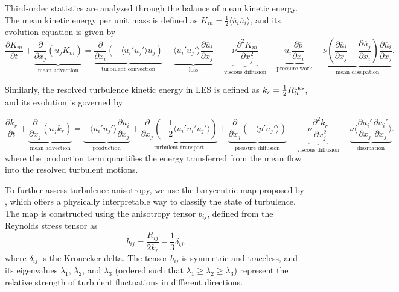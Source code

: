 \documentclass[final,3p]{elsarticle}
\begin{document}
Third-order statistics are analyzed through the balance of mean kinetic energy. The mean kinetic energy per unit mass is defined as $K_m = \frac{1}{2} \langle \overline{u}_i \overline{u}_i \rangle$, and its evolution equation is given by
\begin{equation}
\frac{\partial K_m}{\partial t}
+ \underbrace{ \frac{\partial}{\partial x_j} (\overline{u}_j K_m) }_{\text{mean advection}}
=
\underbrace{ \frac{\partial}{\partial x_i}
\left(
- \langle u_i' u_j' \rangle \overline{u}_j
\right) }_{\text{turbulent convection}}
+
\underbrace{\langle u_i' u_j' \rangle \frac{\partial \overline{u}_i}{\partial x_j} }_{\text{loss}}
+ \underbrace{\nu \frac{\partial^2 K_m}{\partial x_j^2}}_{\text{viscous diffusion}}
- \underbrace{ \overline{u}_i \frac{\partial \overline{p}}{\partial x_i} }_{\text{pressure work}}
- \underbrace{ \nu \left( \frac{\partial \overline{u}_i}{\partial x_j} + \frac{\partial \overline{u}_j}{\partial x_i} \right) \frac{\partial \overline{u}_i}{\partial x_j} }_{\text{mean dissipation}}.
\end{equation}

Similarly, the resolved turbulence kinetic energy in LES is defined as $k_r = \frac{1}{2} R_{ii}^{\hbox{\tiny LES}}$, and its evolution is governed by

\begin{equation}
\frac{\partial k_r}{\partial t}
+ \underbrace{ \frac{\partial}{\partial x_j} (\overline{u}_j k_r) }_{\text{mean advection}}
=
\underbrace{ - \langle u_i' u_j' \rangle \frac{\partial \overline{u}_i}{\partial x_j} }_{\text{production}}
+ \underbrace{ \frac{\partial}{\partial x_j} \left( -\frac{1}{2} \langle u_i' u_i' u_j' \rangle \right) }_{\text{turbulent transport}}
+ \underbrace{ \frac{\partial}{\partial x_j} \left( - \langle p' u_j' \rangle \right) }_{\text{pressure diffusion}}
+ \underbrace{ \nu \frac{\partial^2 k_r}{\partial x_j^2} }_{\text{viscous diffusion}}
- \underbrace{ \nu \langle \frac{\partial u_i'}{\partial x_j} \frac{\partial u_i'}{\partial x_j} \rangle }_{\text{dissipation}}.
\end{equation}
%
where the production term quantifies the energy transferred from the mean flow into the resolved turbulent motions.

To further assess turbulence anisotropy, we use the barycentric map proposed by \citet{banerjee2007presentation}, which offers a physically interpretable way to classify the state of turbulence. The map is constructed using the anisotropy tensor \( b_{ij} \), defined from the Reynolds stress tensor as
\begin{equation}
	b_{ij} = \frac{R_{ij}}{2 k_r} - \frac{1}{3} \delta_{ij},
\end{equation}
where \( \delta_{ij} \) is the Kronecker delta. The tensor \( b_{ij} \) is symmetric and traceless, and its eigenvalues \( \lambda_1 \), \( \lambda_2 \), and \( \lambda_3 \) (ordered such that \( \lambda_1 \geq \lambda_2 \geq \lambda_3 \)) represent the relative strength of turbulent fluctuations in different directions.
\end{document}
